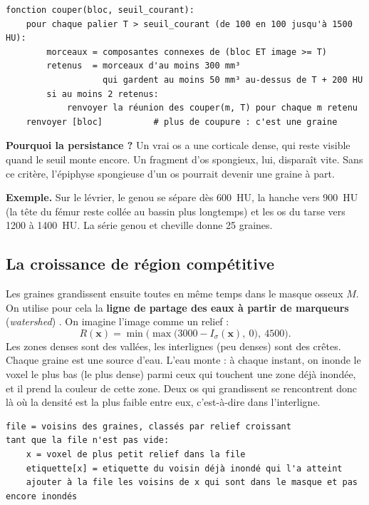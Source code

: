 \documentclass[11pt,a4paper]{article}
\newcommand{\vb}[1]{\mathbf{#1}}
\begin{document}
\begin{Verbatim}[label={\small Principe de la recherche des graines (pseudo-code)}]
fonction couper(bloc, seuil_courant):
    pour chaque palier T > seuil_courant (de 100 en 100 jusqu'à 1500 HU):
        morceaux = composantes connexes de (bloc ET image >= T)
        retenus  = morceaux d'au moins 300 mm³
                   qui gardent au moins 50 mm³ au-dessus de T + 200 HU
        si au moins 2 retenus:
            renvoyer la réunion des couper(m, T) pour chaque m retenu
    renvoyer [bloc]          # plus de coupure : c'est une graine
\end{Verbatim}

\textbf{Pourquoi la persistance ?} Un vrai os a une corticale dense, qui reste visible quand le seuil monte encore. Un
fragment d'os spongieux, lui, disparaît vite. Sans ce critère, l'épiphyse spongieuse d'un os pourrait devenir une graine
à part.

\textbf{Exemple.} Sur le lévrier, le genou se sépare dès 600~HU, la hanche vers 900~HU (la tête du fémur reste
collée au bassin plus longtemps) et les os du tarse vers 1200 à 1400~HU. La série genou et cheville donne 25 graines.

\subsection{La croissance de région compétitive}
\label{sec-croissance}

Les graines grandissent ensuite toutes en même temps dans le masque osseux $M$. On utilise pour cela la \textbf{ligne
de partage des eaux à partir de marqueurs} (\emph{watershed}) \cite{meyer1994}. On imagine l'image comme un relief :
\begin{equation}
  R(\vb{x}) = \min\bigl(\max\bigl(3000 - I_\sigma(\vb{x}),\ 0\bigr),\ 4500\bigr).
\end{equation}
Les zones denses sont des vallées, les interlignes (peu denses) sont des crêtes. Chaque graine est une source d'eau.
L'eau monte : à chaque instant, on inonde le voxel le plus bas (le plus dense) parmi ceux qui touchent une zone déjà
inondée, et il prend la couleur de cette zone. Deux os qui grandissent se rencontrent donc là où la densité est la
plus faible entre eux, c'est-à-dire dans l'interligne.

\begin{Verbatim}[label={\small Principe de la croissance compétitive (pseudo-code)}]
file = voisins des graines, classés par relief croissant
tant que la file n'est pas vide:
    x = voxel de plus petit relief dans la file
    etiquette[x] = etiquette du voisin déjà inondé qui l'a atteint
    ajouter à la file les voisins de x qui sont dans le masque et pas encore inondés
\end{Verbatim}
\end{document}
